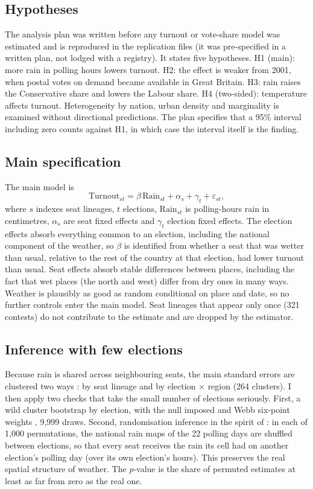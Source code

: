 \documentclass[11pt,a4paper]{article}
\begin{document}
\subsection{Hypotheses}
The analysis plan was written before any turnout or vote-share model was estimated and is reproduced in the replication files (it was pre-specified in a written plan, not lodged with a registry). It states five hypotheses. H1 (main): more rain in polling hours lowers turnout. H2: the effect is weaker from 2001, when postal votes on demand became available in Great Britain. H3: rain raises the Conservative share and lowers the Labour share. H4 (two-sided): temperature affects turnout. Heterogeneity by nation, urban density and marginality is examined without directional predictions. The plan specifies that a 95\% interval including zero counts against H1, in which case the interval itself is the finding.

\subsection{Main specification}
The main model is
\begin{equation}
\text{Turnout}_{st} = \beta\,\text{Rain}_{st} + \alpha_s + \gamma_t + \varepsilon_{st},
\end{equation}
where $s$ indexes seat lineages, $t$ elections, $\text{Rain}_{st}$ is polling-hours rain in centimetres, $\alpha_s$ are seat fixed effects and $\gamma_t$ election fixed effects. The election effects absorb everything common to an election, including the national component of the weather, so $\beta$ is identified from whether a seat that was wetter than usual, relative to the rest of the country at that election, had lower turnout than usual. Seat effects absorb stable differences between places, including the fact that wet places (the north and west) differ from dry ones in many ways. Weather is plausibly as good as random conditional on place and date, so no further controls enter the main model. Seat lineages that appear only once (321 contests) do not contribute to the estimate and are dropped by the estimator.

\subsection{Inference with few elections}
Because rain is shared across neighbouring seats, the main standard errors are clustered two ways \citep{cameron2011}: by seat lineage and by election $\times$ region (264 clusters). I then apply two checks that take the small number of elections seriously. First, a wild cluster bootstrap by election, with the null imposed and Webb six-point weights \citep{cameron2008,webb2023}, 9{,}999 draws. Second, randomisation inference in the spirit of \citet{cooperman2017}: in each of 1{,}000 permutations, the national rain maps of the 22 polling days are shuffled between elections, so that every seat receives the rain its cell had on another election's polling day (over its own election's hours). This preserves the real spatial structure of weather. The $p$-value is the share of permuted estimates at least as far from zero as the real one.
\end{document}
